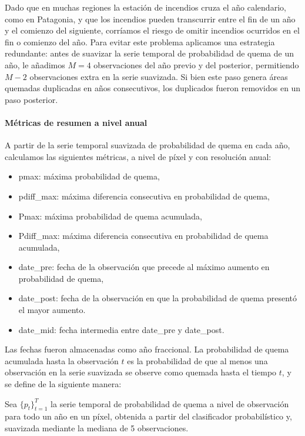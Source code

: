 \documentclass[11pt,a4paper]{article}
\begin{document}
Dado que en muchas regiones la estación de incendios cruza el año calendario, como en Patagonia, y que los incendios pueden transcurrir entre el fin de un año y el comienzo del siguiente, corríamos el riesgo de omitir incendios ocurridos en el fin o comienzo del año. Para evitar este problema aplicamos una estrategia redundante: antes de suavizar la serie temporal de probabilidad de quema de un año, le añadimos $M = 4$ observaciones del año previo y del posterior, permitiendo $M - 2$ observaciones extra en la serie suavizada. Si bien este paso genera áreas quemadas duplicadas en años consecutivos, los duplicados fueron removidos en un paso posterior.

\paragraph{Métricas de resumen a nivel anual}

A partir de la serie temporal suavizada de probabilidad de quema en cada año, calculamos las siguientes métricas, a nivel de píxel y con resolución anual:

\begin{itemize}
  \item pmax: máxima probabilidad de quema,
  \item pdiff\_max: máxima diferencia consecutiva en probabilidad de quema,
  \item Pmax: máxima probabilidad de quema acumulada,
  \item Pdiff\_max: máxima diferencia consecutiva en probabilidad de quema acumulada,
  \item date\_pre: fecha de la observación que precede al máximo aumento en probabilidad de quema,
  \item date\_post: fecha de la observación en que la probabilidad de quema presentó el mayor aumento.
  \item date\_mid: fecha intermedia entre date\_pre y date\_post.
\end{itemize}

Las fechas fueron almacenadas como año fraccional. 
La probabilidad de quema acumulada hasta la observación $t$ es la probabilidad de que al menos una observación en la serie suavizada se observe como quemada hasta el tiempo $t$, y se define de la siguiente manera:

Sea $\{ p_t \}_{t=1}^{T}$ la serie temporal de probabilidad de quema a nivel de observación para todo un año en un píxel, obtenida a partir del clasificador probabilístico y, suavizada mediante la mediana de 5 observaciones.
\end{document}
